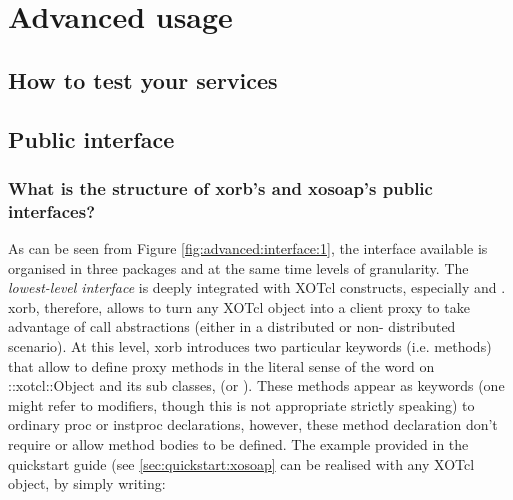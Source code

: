   \section{Advanced usage}\label{sec:advanced}
  \subsection{How to test your services}
    \subsection{Public interface}\label{sec:interface}
    \subsubsection{What is the structure of xorb's and xosoap's public interfaces?}\label{sec:advanced:interface:what}
    As can be seen from Figure \ref{fig:advanced:interface:1}, the
    interface available is organised in three packages and at the same
    time levels of granularity. The \emph{lowest-level interface} is
    deeply integrated with XOTcl constructs, especially
     and
    . xorb, therefore, allows to turn any
    XOTcl object into a client proxy to take advantage of call
    abstractions (either in a distributed or non- distributed
    scenario). At this level, xorb introduces two particular keywords
    (i.e. methods) that allow to define proxy methods in the literal sense
    of the word on ::xotcl::Object and its sub classes,
     (or
    ). These methods appear
    as keywords (one might refer to modifiers, though this is not
    appropriate strictly speaking) to ordinary proc or instproc
    declarations, however, these method declaration don't require or allow
    method bodies to be defined. The example provided in the quickstart
    guide (see \ref{sec:quickstart:xosoap} can be realised with any XOTcl
    object, by simply writing:
